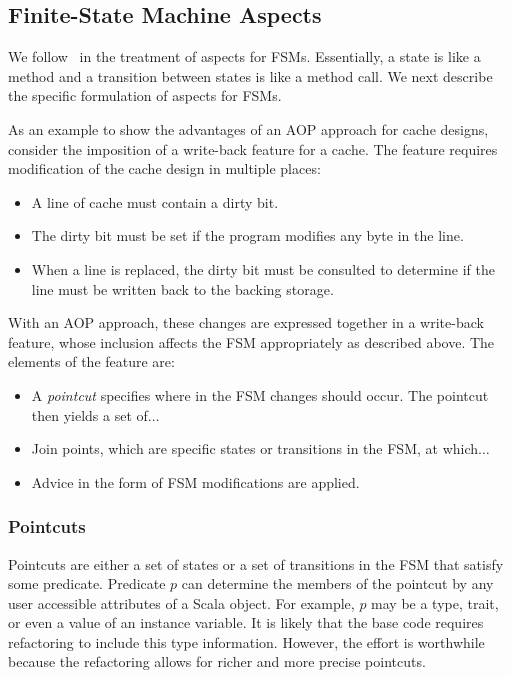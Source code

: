 \documentclass[conference]{IEEEtran}
\begin{document}
\subsection{Finite-State Machine Aspects}

We follow~\cite{aspectsUML} in the treatment of aspects for FSMs. Essentially, a state is like a method and a transition between states is like a method call.  We next describe the specific formulation of aspects for FSMs.  

As an example to show the advantages of an AOP approach for cache designs, consider the imposition of a write-back feature for a cache.  The feature requires modification of the cache design in multiple places:
\begin{itemize}
    \item A line of cache must contain a dirty bit.
    \item The dirty bit must be set if the program modifies any byte in the line.
    \item When a line is replaced, the dirty bit must be consulted to determine if the line must be written back to the backing storage.
\end{itemize}
With an AOP approach, these changes are expressed together in a write-back feature, whose inclusion affects the FSM appropriately as described above.  The elements of the feature are:
\begin{itemize}
    \item A \emph{pointcut} specifies where in the FSM changes should occur.  The pointcut then yields a set of$\ldots$
    \item Join points, which are specific states or transitions in the FSM, at which$\ldots$
    \item Advice in the form of FSM modifications are applied.
\end{itemize}

\subsubsection{Pointcuts}
Pointcuts are either a set of states or a set of transitions in the FSM that satisfy some predicate. Predicate $p$ can determine the members of the pointcut by any user accessible attributes of a Scala object. For example, $p$ may be a type, trait, or even a value of an instance variable. It is likely that the base code requires refactoring to include this type information. However, the effort is worthwhile because the refactoring allows for richer and more precise pointcuts.
\end{document}
